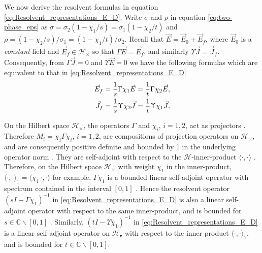 \documentclass{cmslatex}
\begin{document}
We now derive the resolvent formulas in equation
\eqref{eq:Resolvent_representations_E_D}.
Write $\sigma$ and $\rho$ in 
equation \eqref{eq:two-phase_eps} as $\sigma=\sigma_2(1-\chi_1/s)=\sigma_1(1-\chi_2/t)$ and
$\rho=(1-\chi_2/s)/\sigma_1=(1-\chi_1/t)/\sigma_2$. Recall that
$\vec{E}=\vec{E}_0+\vec{E}_f$, where $\vec{E}_0$ is a \emph{constant}
field and $\vec{E}_f\in\mathscr{H}_\times$ so that
$\Gamma\vec{E}=\vec{E}_f$, and similarly
$\Upsilon\vec{J}=\vec{J}_f$. Consequently, from $\Gamma\vec{J}=0$ and $\Upsilon\vec{E}=0$
we have the following formulas which are equivalent to that in 
\eqref{eq:Resolvent_representations_E_D}  
% 
\begin{align}\label{eq:Proj_rep_Ef_Jf}
  \vec{E}_f&=\frac{1}{s}\Gamma\chi_1\vec{E}=\frac{1}{t}\Gamma\chi_2\vec{E}, \\
  \vec{J}_f&=\frac{1}{s}\Upsilon\chi_2\vec{J}=\frac{1}{t}\Upsilon\chi_1\vec{J}.\notag
\end{align}
%




On the Hilbert space $\mathscr{H}_\times$, the operators $\Gamma$ and $\chi_i$,
$i=1,2$, act as projectors \cite{Golden:CMP-473}. Therefore 
$M_i=\chi_i\Gamma\chi_i$, $i=1,2$, are compositions of projection operators on
$\mathscr{H}_\times$, and are consequently positive definite and bounded by
1 in the underlying operator norm \cite{Rudin:87}. They are
self-adjoint with respect to the $\mathscr{H}$-inner-product $\langle\cdot,\cdot\rangle$
\cite{Golden:CMP-473}. Therefore, on the Hilbert space $\mathscr{H}_\times$
with weight $\chi_1$ in the inner-product, $\langle\cdot,\cdot\rangle_1=\langle\chi_1\,\cdot,\cdot\rangle$ for
example, $\Gamma\chi_1$ is a bounded linear self-adjoint operator with
spectrum contained in the interval $[0,1]$
\cite{Golden:CMP-473,Folland:95,Rudin:87}. Hence the resolvent
operator $(sI-\Gamma\chi_1)^{-1}$ in \eqref{eq:Resolvent_representations_E_D}
is also a linear self-adjoint operator with respect to the same
inner-product, and is bounded for  $s\in\mathbb{C}\backslash[0,1]$
\cite{Stone:64}. Similarly, $(tI-\Upsilon\chi_1)^{-1}$ in
\eqref{eq:Resolvent_representations_E_D} is a linear self-adjoint
operator on $\mathscr{H}_\bullet$ with respect to the inner-product
$\langle\cdot,\cdot\rangle_1$, and is bounded for $t\in\mathbb{C}\backslash[0,1]$.
\end{document}
